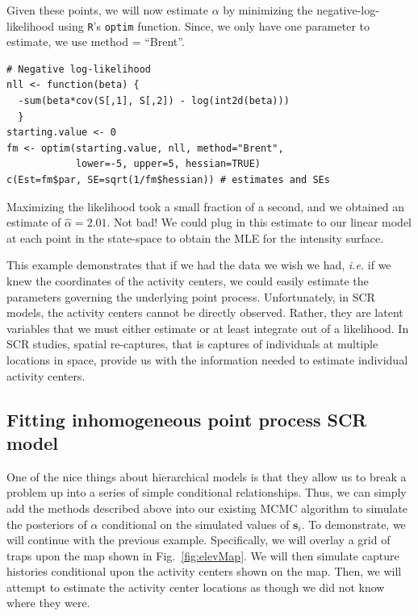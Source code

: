 Given these points, we will now estimate $\alpha$ by minimizing the
negative-log-likelihood using \verb+R+'s \verb+optim+ function. Since,
we only have one parameter to estimate, we use method = ``Brent''.

\begin{small}
\begin{verbatim}
# Negative log-likelihood
nll <- function(beta) {
  -sum(beta*cov(S[,1], S[,2]) - log(int2d(beta)))
  }
starting.value <- 0
fm <- optim(starting.value, nll, method="Brent",
            lower=-5, upper=5, hessian=TRUE)
c(Est=fm$par, SE=sqrt(1/fm$hessian)) # estimates and SEs
\end{verbatim}
\end{small}


Maximizing the likelihood took a small fraction of a second, and we
obtained an estimate of $\hat{\alpha}=2.01$. Not bad! We could plug in
this estimate to our linear model at each point in the state-space to
obtain the MLE for the intensity surface.

This example demonstrates
that if we had the data we wish we had, {\it i.e.} if we knew the
coordinates of the activity centers, we could easily estimate the
parameters governing the underlying point process. Unfortunately, in
SCR models, the activity centers cannot be directly observed. Rather,
they are latent variables that we must either estimate or at least integrate out
of a likelihood. In SCR studies, spatial re-captures, that is captures
of individuals at
multiple locations in space, provide us with the information needed to
estimate individual activity centers.

\subsection{Fitting inhomogeneous point process SCR model}

One
of the nice things about hierarchical models is that they allow us to
break a problem up into a series of simple conditional
relationships. Thus,
we can simply add the methods described above into our existing MCMC
algorithm to simulate the posteriors of $\alpha$ conditional on the
simulated values of $\mathbf{s}_i$. To demonstrate, we will continue with
the previous example. Specifically, we will overlay a grid of
traps upon the map shown in Fig.~\ref{fig:elevMap}. We will then
simulate capture histories conditional upon the activity centers shown
on the map. Then, we will attempt to estimate the activity center
locations as though we did not know where they were.


